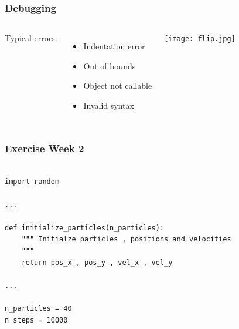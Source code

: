 \begin{frame}[fragile]

    \frametitle{Debugging}


    \begin{columns}[t]


    Typical errors:

    \begin{itemize}
        \item Indentation error
        \item Out of bounds
        \item Object not callable
        \item Invalid syntax
    \end{itemize}


        
            \texttt{[image: flip.jpg]}

    \end{columns}


\end{frame}



\begin{frame}[fragile]

    \frametitle{Exercise Week 2}

\begin{lstlisting}

import random

...

def initialize_particles(n_particles):
    """ Initialze particles , positions and velocities
    """
    return pos_x , pos_y , vel_x , vel_y

...

n_particles = 40
n_steps = 10000

\end{lstlisting}

\end{frame}







